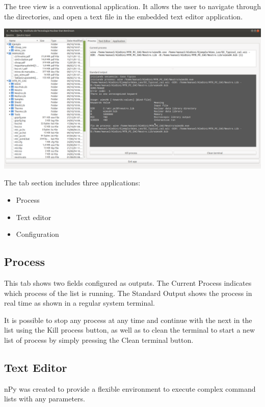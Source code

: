 \documentclass[a4paper,10pt]{article}
\begin{document}
The tree view is a conventional application. It allows the user to navigate through the directories, and open a text file in the embedded text editor application.

\begin{center}
 \includegraphics[width=\textwidth]{img/mainWindow.png}
\end{center}

\noindent The tab section includes three applications:

\begin{itemize}
 \item Process
 \item Text editor
 \item Configuration
\end{itemize}

\subsection{Process}
This tab shows two fields configured as outputs. The Current Process indicates which process of the list is running. The Standard Output shows the process in real time as shown in a regular system terminal.

It is possible to stop any process at any time and continue with the next in the list using the Kill process button, as well as to clean the terminal to start a new list of process by simply pressing the Clean terminal button.

\subsection{Text Editor}
nPy was created to provide a flexible environment to execute complex command lists with any parameters. 
\end{document}
